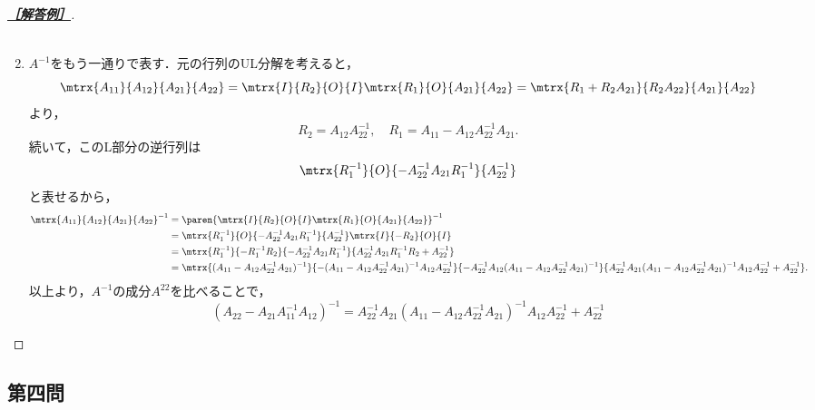 \documentclass[uplatex,dvipdfmx]{jsarticle}
\begin{document}
\begin{proof}[\textbf{\underline{［解答例］}}]
\begin{enumerate}
\begin{align*}
        \end{align*}
        \item $A^{-1}$をもう一通りで表す．元の行列のUL分解を考えると，
        \[\mtrx{A_{11}}{A_{12}}{A_{21}}{A_{22}}=\mtrx{I}{R_2}{O}{I}\mtrx{R_1}{O}{A_{21}}{A_{22}}=\mtrx{R_1+R_2A_{21}}{R_2A_{22}}{A_{21}}{A_{22}}\]
        より，
        \[R_2=A_{12}A_{22}^{-1},\quad R_1=A_{11}-A_{12}A_{22}^{-1}A_{21}.\]
        続いて，このL部分の逆行列は
        \[\mtrx{R_1^{-1}}{O}{-A_{22}^{-1}A_{21}R_1^{-1}}{A_{22}^{-1}}\]
        と表せるから，
        \begin{align*}
            \mtrx{A_{11}}{A_{12}}{A_{21}}{A_{22}}^{-1}&=\paren{\mtrx{I}{R_2}{O}{I}\mtrx{R_1}{O}{A_{21}}{A_{22}}}^{-1}\\
            &=\mtrx{R_1^{-1}}{O}{-A_{22}^{-1}A_{21}R_1^{-1}}{A_{22}^{-1}}\mtrx{I}{-R_2}{O}{I}\\
            &=\mtrx{R_1^{-1}}{-R_1^{-1}R_2}{-A_{22}^{-1}A_{21}R_1^{-1}}{A_{22}^{-1}A_{21}R_1^{-1}R_2+A_{22}^{-1}}\\
            &=\mtrx{(A_{11}-A_{12}A_{22}^{-1}A_{21})^{-1}}{-(A_{11}-A_{12}A_{22}^{-1}A_{21})^{-1}A_{12}A_{22}^{-1}}{-A_{22}^{-1}A_{12}(A_{11}-A_{12}A_{22}^{-1}A_{21})^{-1}}{A_{22}^{-1}A_{21}(A_{11}-A_{12}A_{22}^{-1}A_{21})^{-1}A_{12}A_{22}^{-1}+A_{22}^{-1}}.
        \end{align*}
        以上より，$A^{-1}$の成分$A^{22}$を比べることで，
        \[(A_{22}-A_{21}A_{11}^{-1}A_{12})^{-1}=A_{22}^{-1}A_{21}(A_{11}-A_{12}A_{22}^{-1}A_{21})^{-1}A_{12}A_{22}^{-1}+A_{22}^{-1}\]
    \end{enumerate}
\end{proof}

\subsection{第四問}
\end{document}
